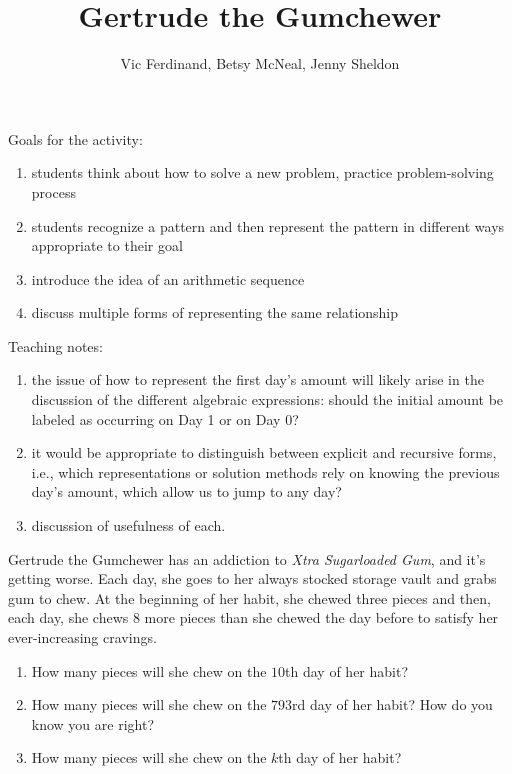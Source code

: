 \documentclass{ximera}
\title{Gertrude the Gumchewer}
\author{Vic Ferdinand, Betsy McNeal, Jenny Sheldon}
\begin{document}
\begin{abstract}
\end{abstract}
\maketitle

\begin{instructorIntro}
Goals for the activity:
\begin{enumerate}
\item students think about how to solve a new problem, practice problem-solving process
\item  students recognize a pattern and then represent the pattern in different ways appropriate to their goal
\item  introduce the idea of an arithmetic sequence
\item discuss multiple forms of representing the same relationship 
\end{enumerate}

Teaching notes:
\begin{enumerate}
\item the issue of how to represent the first day's amount will likely arise in the discussion of the different algebraic expressions:  should the initial amount be labeled as occurring on Day 1 or on Day 0?
\item it would be appropriate to distinguish between explicit and recursive forms, i.e., which representations or solution methods rely on knowing the previous day's amount, which allow us to jump to any day?
\item discussion of usefulness of each.
\end{enumerate}
\end{instructorIntro}

\begin{problem}
Gertrude the Gumchewer has an addiction to \textit{Xtra Sugarloaded
  Gum}, and it's getting worse.  Each day, she goes to her always
stocked storage vault and grabs gum to chew.  At the beginning of her
habit, she chewed three pieces and then, each day, she chews 8 more
pieces than she chewed the day before to satisfy her ever-increasing
cravings.
\begin{enumerate}
\item How many pieces will she chew on the $10$th day of her habit?
\item How many pieces will she chew on the $793$rd day of her habit? How do you know you are right?
\item How many pieces will she chew on the $k$th day of her habit?
\end{enumerate}
\end{problem}
\end{document}
